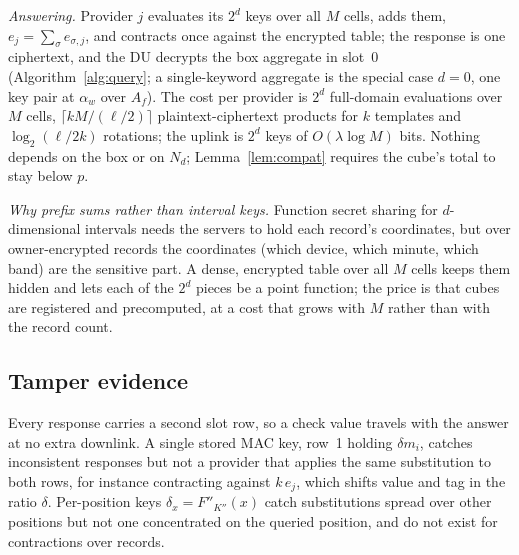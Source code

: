 \emph{Answering.} Provider $j$ evaluates its $2^d$ keys over all $M$ cells,
adds them, $e_j=\sum_\sigma e_{\sigma,j}$, and contracts once against the
encrypted table; the response is one ciphertext, and the DU decrypts the box
aggregate in slot~0 (Algorithm~\ref{alg:query}; a single-keyword aggregate is
the special case $d=0$, one key pair at $\alpha_w$ over $A_f$). The cost per
provider is
$2^d$ full-domain evaluations over $M$ cells, $\lceil kM/(\ell/2)\rceil$
plaintext-ciphertext products for $k$ templates and $\log_2(\ell/2k)$
rotations; the uplink is $2^d$ keys of $O(\lambda\log M)$ bits. Nothing depends
on the box or on $N_d$; Lemma~\ref{lem:compat} requires the cube's total to stay
below $p$.

\emph{Why prefix sums rather than interval keys.} Function secret sharing for
$d$-dimensional intervals \citep{boyle2016function} needs the servers to hold
each record's coordinates, but over owner-encrypted records the coordinates
(which device, which minute, which band) are the sensitive part. A dense,
encrypted table over all $M$ cells keeps them hidden and lets each of the
$2^d$ pieces be a point function; the price is that cubes are registered and
precomputed, at a cost that grows with $M$ rather than with the record count.

\begin{algorithm}[t]
\footnotesize
\caption{Outsourcing at the data owner.}
\label{alg:setup}

\end{algorithm}

\begin{algorithm}[t]
\footnotesize
\caption{Verified range query.}
\label{alg:query}

\end{algorithm}

\subsection{Tamper evidence}
\label{sec:verify}
Every response carries a second slot row, so a check value travels with the
answer at no extra downlink. A single stored MAC key, row~1 holding $\delta
m_i$, catches inconsistent responses but not a provider that applies the same
substitution to both rows, for instance contracting against $k\,e_j$, which
shifts value and tag in the ratio $\delta$. Per-position keys
$\delta_x=F''_{K''}(x)$ catch substitutions spread over other positions but
not one concentrated on the queried position, and do not exist for
contractions over records.

